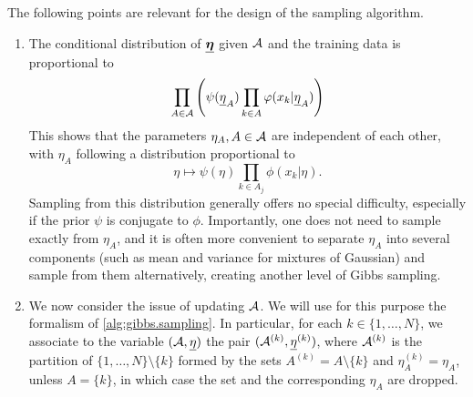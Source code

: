The following points are relevant for the design of the sampling algorithm. 
\begin{enumerate}[label=(\arabic*), wide=0.5cm]
\item The conditional distribution of $\underline {{\bm{\eta}}}$ given ${\mathcal A}$ and the training data is proportional to 
\[
\prod_{A\in{\mathcal A}} \left(\psi({\underline{\eta}}_A) \prod_{k\in A}  \varphi(x_k|{\underline{\eta}}_A)\right) 
\]
This shows that the parameters $\eta_A, A\in {\mathcal A}$  are independent of each other, with $\eta_A$ following a distribution proportional to
\[
\eta \mapsto \psi(\eta) \prod_{k\in A_j}  \phi(x_k|\eta).
\]
Sampling from this distribution generally offers no special difficulty, especially if the prior $\psi$ is conjugate to $\phi$. Importantly, one does not need to sample exactly from $\eta_A$, and it is often more convenient to separate $\eta_A$ into several components (such as mean and variance for mixtures of Gaussian) and sample from them alternatively, creating another level of Gibbs sampling.


\item We now consider  the issue of updating ${\mathcal A}$. We will use for this purpose the formalism of \cref{alg:gibbs.sampling}. In particular,  for each $k\in \{1, \ldots, N\}$, we associate to the variable $ ({\mathcal A}, {\underline{\eta}})$ the pair $({\mathcal A}^{(k)}, {\underline{\eta}}^{(k)})$, where ${\mathcal A}^{(k)}$ is the partition  of $\{1, \ldots, N\} \setminus\{k\}$ formed by the sets $A^{(k)}  = A \setminus \{k\}$  and $\eta_A^{(k)} = \eta_A$, unless $A = \{k\}$, in which case the set and the corresponding $\eta_A$ are dropped. 


\end{enumerate}
